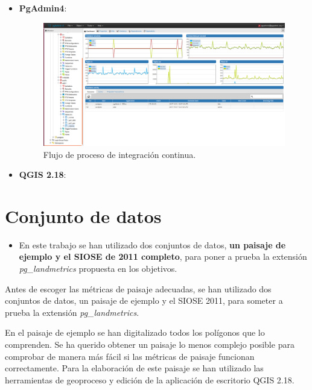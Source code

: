 \begin{itemize}
\item\textbf{PgAdmin4}: 

\begin{figure}
\begin{center}
\includegraphics[width=\textwidth]{Metodologia/Figs/carga-siose-2011.png}
\caption{Flujo de proceso de integración continua. \label{fig:carga}}
\end{center}
\end{figure}

\item\textbf{QGIS 2.18}: 
\end{itemize}

\section{Conjunto de datos}

\begin{graybox}
\begin{itemize}
\item En este trabajo se han utilizado dos conjuntos de datos, \textbf{un paisaje de ejemplo y el SIOSE de 2011 completo}, para poner a prueba la extensión \textit{pg\_landmetrics} propuesta en los objetivos.
\end{itemize}
\end{graybox}

Antes de escoger las métricas de paisaje adecuadas, se han utilizado dos conjuntos de datos, un paisaje de ejemplo y el SIOSE 2011, para someter a prueba la extensión \textit{pg\_landmetrics}.

En el paisaje de ejemplo se han digitalizado todos los polígonos que lo comprenden. Se ha querido obtener un paisaje lo menos complejo posible para comprobar de manera más fácil si las métricas de paisaje funcionan correctamente. Para la elaboración de este paisaje se han utilizado las herramientas de geoproceso y edición de la aplicación de escritorio QGIS 2.18. 

